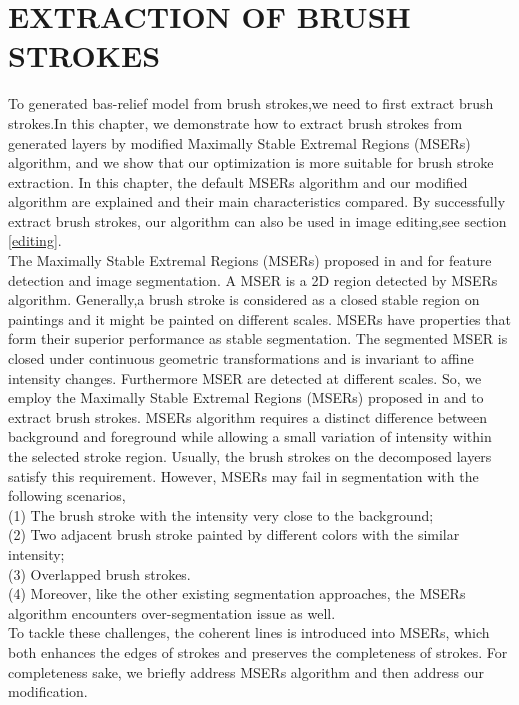 \clearpage
\chapter{EXTRACTION OF BRUSH STROKES}\label{extract}
To generated bas-relief model from brush strokes,we need to first extract brush strokes.In this chapter, we demonstrate how to extract brush strokes from generated layers by modified Maximally Stable Extremal Regions (MSERs) algorithm, and we show that our optimization is more suitable for brush stroke extraction. In this chapter, the default MSERs algorithm and our modified algorithm are explained and their main characteristics compared. By successfully extract brush strokes, our algorithm can also be used in image editing,see section \ref{editing}.\\
The Maximally Stable Extremal Regions (MSERs) proposed in \cite{donoser2006efficient} and \cite{nister2008linear}for feature detection and image segmentation. A MSER is a 2D region detected by MSERs algorithm.  Generally,a brush stroke is considered as a closed stable region on paintings and it might be painted on different scales. MSERs have properties that form their superior performance as stable segmentation. The segmented MSER is closed under continuous geometric transformations and is invariant to affine intensity changes. Furthermore MSER are detected at different scales. So, we employ the Maximally Stable Extremal Regions (MSERs) proposed in \cite{donoser2006efficient} and \cite{nister2008linear} to extract brush strokes. MSERs algorithm requires a distinct difference between background and foreground while allowing a small variation of intensity within the selected stroke region. Usually, the brush strokes on the decomposed layers satisfy this requirement.
However, MSERs may fail in segmentation with the following scenarios,\\ 
(1) The brush stroke with the intensity very close to the background; \\
(2) Two adjacent brush stroke painted by different colors with the similar intensity;\\
(3) Overlapped brush strokes.\\
(4) Moreover, like the other existing segmentation approaches, the MSERs algorithm encounters over-segmentation issue as well. \\
To tackle these challenges, the coherent lines \cite{kang2007coherent} is introduced into MSERs, which both enhances the edges of strokes and preserves the completeness of strokes. For completeness sake, we briefly address MSERs algorithm and then address our modification.
